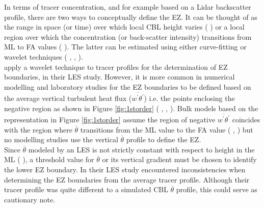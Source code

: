 In terms of tracer concentration, and for example based on a Lidar backscatter profile, there are two ways to conceptually define the \acs{EZ}.  It can be thought of as the range in space (or time) over which local \acs{CBL} height varies (\citeauthor{CrumStullEl} \citeyear{CrumStullEl}) or a local region over which the concentration (or back-scatter intensity) transitions from \acs{ML} to \acs{FA} values (\citeauthor{Traum11} \citeyear{Traum11}).  The latter can be estimated using either curve-fitting or wavelet techniques (\citeauthor{Traum11} \citeyear{Traum11}, \citeauthor{SteynBaldHoff} \citeyear{SteynBaldHoff}, \citeauthor{BrooksFowler2} \citeyear{BrooksFowler2}).\\

\citeauthor{BrooksFowler2} apply a wavelet technique to tracer profiles for the determination of \acs{EZ} boundaries, in their \citeyear{BrooksFowler2} \acs{LES} study.  However, it is more common in numerical modelling and laboratory studies for the \acs{EZ} boundaries to be defined based on the average vertical turbulent heat flux ($\overline{w^{'}\theta^{'}}$) i.e. the points enclosing the negative region as shown in Figure \ref{fig:1storder} (\citeauthor{DearWill80} \citeyear{DearWill80}, \citeauthor{FedConzMir04} \citeyear{FedConzMir04}, \citeauthor{GarciaMellado} \citeyear{GarciaMellado}).  Bulk models based on the representation in Figure \ref{fig:1storder} assume the region of negative $\overline{w^{'}\theta^{'}}$ coincides with the region where $\overline{\theta}$ transitions from the \acs{ML} value to the \acs{FA} value (\citeauthor{Deardorff79} \citeyear{Deardorff79}, \citeauthor{FedConzMir04} \citeyear{FedConzMir04}) but no modelling studies use the vertical $\overline{\theta}$ profile to define the \acs{EZ}.\\

Since $\overline{\theta}$ modeled by an \acs{LES} is not strictly constant with respect to height in the \acs{ML} (\citeauthor{FedConzMir04} \citeyear{FedConzMir04}), a threshold value for $\overline{\theta}$ or its vertical gradient must be chosen to identify the lower \acs{EZ} boundary.  In their \citeyear{BrooksFowler2} \acs{LES} study \citeauthor{BrooksFowler2} encountered inconsistencies when determining the \acs{EZ} boundaries from the average tracer profile.  Although their tracer profile was quite different to a simulated \acs{CBL} $\overline{\theta}$ profile, this could serve as cautionary note.\\             


